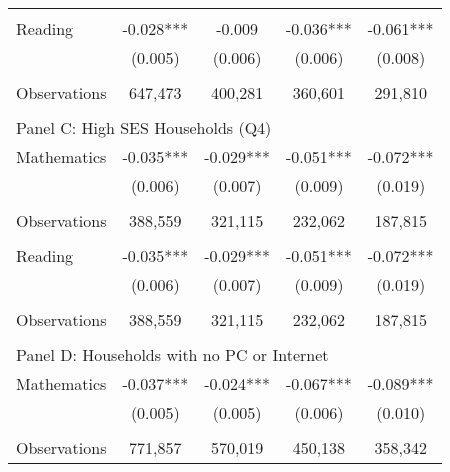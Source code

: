 {\begin{tabular}{lcccc}
&  &  & &  \\
Reading             &      -0.028***&      -0.009   &      -0.036***&      -0.061***\\
                    &     (0.005)   &     (0.006)   &     (0.006)   &     (0.008)   \\
                    &               &               &               &               \\
Observations        &     647,473   &     400,281   &     360,601   &     291,810   \\
 
&  &  & &  \\
\multicolumn{5}{l}{Panel C: High SES Households (Q4)} \\
Mathematics         &      -0.035***&      -0.029***&      -0.051***&      -0.072***\\
                    &     (0.006)   &     (0.007)   &     (0.009)   &     (0.019)   \\
                    &               &               &               &               \\
Observations        &     388,559   &     321,115   &     232,062   &     187,815   \\
 
&  &  & &  \\
Reading             &      -0.035***&      -0.029***&      -0.051***&      -0.072***\\
                    &     (0.006)   &     (0.007)   &     (0.009)   &     (0.019)   \\
                    &               &               &               &               \\
Observations        &     388,559   &     321,115   &     232,062   &     187,815   \\
 
&  &  & &  \\
\multicolumn{5}{l}{Panel D: Households with no PC or Internet} \\
Mathematics         &      -0.037***&      -0.024***&      -0.067***&      -0.089***\\
                    &     (0.005)   &     (0.005)   &     (0.006)   &     (0.010)   \\
                    &               &               &               &               \\
Observations        &     771,857   &     570,019   &     450,138   &     358,342   \\
 

\end{tabular}}

